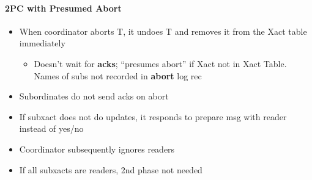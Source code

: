 \paragraph{2PC with Presumed Abort}
\begin{itemize}
\item When coordinator aborts T, it undoes T and removes it from
  the Xact table immediately
  \begin{itemize}
  \item Doesn't wait for \textbf{acks}; ``presumes abort'' if
    Xact not in Xact Table. Names of subs not recorded in \textbf{abort}
    log rec
  \end{itemize}

\item Subordinates do not send acks on abort
\item If subxact does not do updates, it responds to
  prepare msg with reader instead of yes/no
\item Coordinator subsequently ignores readers
\item If all subxacts are readers, 2nd phase not needed
\end{itemize}

